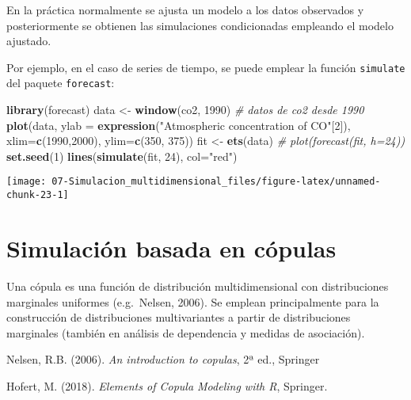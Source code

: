 \documentclass[
]{book}
\newenvironment{Shaded}{\begin{snugshade}}{\end{snugshade}}
\newcommand{\CommentTok}[1]{\textcolor[rgb]{0.56,0.35,0.01}{\textit{#1}}}
\newcommand{\DataTypeTok}[1]{\textcolor[rgb]{0.13,0.29,0.53}{#1}}
\newcommand{\DecValTok}[1]{\textcolor[rgb]{0.00,0.00,0.81}{#1}}
\newcommand{\KeywordTok}[1]{\textcolor[rgb]{0.13,0.29,0.53}{\textbf{#1}}}
\newcommand{\NormalTok}[1]{#1}
\newcommand{\StringTok}[1]{\textcolor[rgb]{0.31,0.60,0.02}{#1}}
\theoremstyle{break}
\theoremstyle{definition}
\theoremstyle{definition}
\theoremstyle{definition}
\theoremstyle{remark}
\begin{document}
En la práctica normalmente se ajusta un modelo a los datos observados y
posteriormente se obtienen las simulaciones condicionadas empleando
el modelo ajustado.

Por ejemplo, en el caso de series de tiempo, se puede emplear la función \texttt{simulate}
del paquete \texttt{forecast}:

\begin{Shaded}
\begin{Highlighting}[]
\KeywordTok{library}\NormalTok{(forecast)}
\NormalTok{data <-}\StringTok{ }\KeywordTok{window}\NormalTok{(co2, }\DecValTok{1990}\NormalTok{) }\CommentTok{# datos de co2 desde 1990}
\KeywordTok{plot}\NormalTok{(data, }\DataTypeTok{ylab =} \KeywordTok{expression}\NormalTok{(}\StringTok{"Atmospheric concentration of CO"}\NormalTok{[}\DecValTok{2}\NormalTok{]), }
     \DataTypeTok{xlim=}\KeywordTok{c}\NormalTok{(}\DecValTok{1990}\NormalTok{,}\DecValTok{2000}\NormalTok{), }\DataTypeTok{ylim=}\KeywordTok{c}\NormalTok{(}\DecValTok{350}\NormalTok{, }\DecValTok{375}\NormalTok{))}
\NormalTok{fit <-}\StringTok{ }\KeywordTok{ets}\NormalTok{(data)}
\CommentTok{# plot(forecast(fit, h=24))}
\KeywordTok{set.seed}\NormalTok{(}\DecValTok{1}\NormalTok{)}
\KeywordTok{lines}\NormalTok{(}\KeywordTok{simulate}\NormalTok{(fit, }\DecValTok{24}\NormalTok{), }\DataTypeTok{col=}\StringTok{"red"}\NormalTok{)}
\end{Highlighting}
\end{Shaded}

\begin{center}\texttt{[image: 07-Simulacion\_multidimensional\_files/figure-latex/unnamed-chunk-23-1]} \end{center}

\hypertarget{simulaciuxf3n-basada-en-cuxf3pulas}{%
\section{Simulación basada en cópulas}\label{simulaciuxf3n-basada-en-cuxf3pulas}}

Una cópula es una función de distribución multidimensional con
distribuciones marginales uniformes (e.g.~Nelsen, 2006).
Se emplean principalmente para la construcción de distribuciones
multivariantes a partir de distribuciones marginales (también en
análisis de dependencia y medidas de asociación).

Nelsen, R.B. (2006). \emph{An introduction to copulas}, 2ª ed., Springer

Hofert, M. (2018). \emph{Elements of Copula Modeling with R}, Springer.
\end{document}

